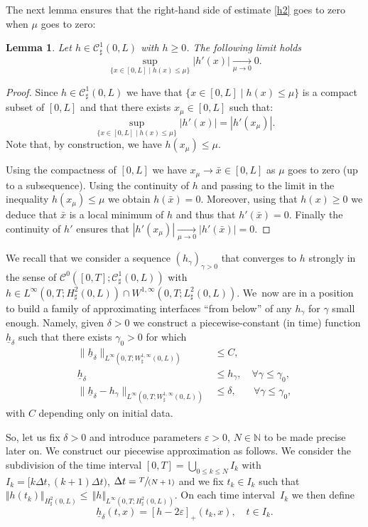 \documentclass[11pt]{article}
\let\mathcal\mathscr
\newcommand{\spfrac}[2]{\sfrac{#1}{(#2)}}
\newtheorem{lemma}[theorem]{Lemma}
\theoremstyle{remark}
\theoremstyle{definition}
\newcommand{\norme}[1]{\,\Vert #1\Vert}
\newcommand{\vnorme}[1]{\Vert #1\Vert}
\newcommand{\hb}{{\underline{h}}}
\begin{document}
The next lemma ensures that the right-hand side of estimate \eqref{h2} goes to zero when $\mu$ goes to zero:
\begin{lemma}\label{lemma.conv.zero}Let $h \in \mathcal{C}_\sharp^{1}(0,L)$ with $h\geq 0$. The following limit holds
\[\sup_{\{x\in [0, L]\mid h(x)\leq\mu\}}\vert h'(x)\vert \underset{\mu\to 0}{\to} 0.
\]
\end{lemma}
\begin{proof}Since $ h \in \mathcal{C}^1_\sharp(0,L)$ we have that $\{ x \in [0,L]\mid h(x)\leq\mu\}$ is a compact subset of $[0,L]$ and that there exists $x_{\mu}\in [0,L]$ such that:
\[
\sup_{\{x\in [0, L]\mid h(x)\leq\mu\}} |h'(x)|= |h'(x_{\mu})|.
\]
Note that, by construction, we have $h(x_{\mu})\leq \mu$.

Using the compactness of $[0,L]$ we have $x_{\mu}\to \bar x\in [0,L]$ as $\mu$ goes to zero (up to a subsequence). Using the continuity of $h$ and passing to the limit in the inequality $h(x_{\mu})\leq \mu$ we obtain $h(\bar x)=0$. Moreover, using that $h(x)\geq 0$ we deduce that $\bar x$ is a local minimum of $h$ and thus that $h'(\bar x)=0$. Finally the continuity of $h'$ ensures that $|h'(x_{\mu})|\underset{\mu\to 0}{\to}|h'(\bar x)|=0$.
\end{proof}

We recall that we consider a sequence $(h_{\gamma})_{\gamma >0}$
that converges to $h$ strongly in the sense of $\mathcal{C}^{0}([0,T];\mathcal{C}_\sharp^{1}(0,L))$ with $h\in L^{\infty}(0,T;H_\sharp^{2}(0,L)) \cap W^{1,\infty}(0, T; L^2_\sharp(0, L))$.
We~now are in a position to build a family of approximating interfaces ``from below'' of any $h_\gamma$ for $\gamma$ small enough. Namely, given $\delta >0$ we construct a piecewise-constant (in time) function $\underline{h}_{\delta}$
such that there exists $\gamma_0 >0$ for which
\begin{align}
\|\hb_{\delta}\|_{L^{\infty}(0,T;W^{1,\infty}_{\sharp}(0,L))} &\leq C, \label{estimate.hb}\\
\hb_{\delta}&\leq h_{\gamma}, \quad\forall \gamma\leq\gamma_{0}, \label{eq.interfacebelow}\\
\| \hb_{\delta}- h_\gamma\|_{L^\infty(0,T; W_\sharp^{1, \infty}(0, L))}&\leq \delta, \;\;\,\quad\forall \gamma\leq\gamma_{0}, \label{estimation-diffth}
\end{align}
with $C$ depending only on initial data.

So, let us fix $\delta >0$ and introduce parameters $\varepsilon >0$, $N\in \mathbb N$ to be made precise later on.
We construct our piecewise approximation as follows. We consider the subdivision of the time interval $[0,T]=\bigcup_{0\leq k\leq N}I_{k}$ with $I_{k}=[k\Delta t,(k+1)\Delta t)$, $\Delta t=\spfrac{T}{N+1}$ and we fix $t_{k}\in I_{k}$ such that $\vnorme{h(t_{k})}_{H^{2}_{\sharp}(0,L)}\leq \norme{h}_{L^{\infty}(0,T;H^{2}_{\sharp}(0,L))}$. On each time interval~$I_k$ we then define
\begin{equation}
\label{def-sous-h}
\hb_{\delta}(t, x)= [h-2\varepsilon]_+(t_{k},x), \quad t\in I_k.
\end{equation}
\end{document}
